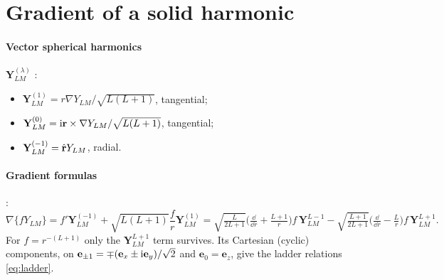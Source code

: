 \section{Gradient of a solid harmonic}
\paragraph{Vector spherical harmonics} $\mathbf Y^{(\lambda)}_{LM}$ \citep[\S7.3, eq.~25--27]{Varshalovich1988}:
\begin{itemize}
  \item $\mathbf Y^{(1)}_{LM}=r\nabla Y_{LM}/\sqrt{L(L+1)}$, tangential;
  \item $\mathbf Y^{(0)}_{LM}=\mathrm{i}\mathbf r\times\nabla Y_{LM}/\sqrt{L(L+1)}$, tangential;
  \item $\mathbf Y^{(-1)}_{LM}=\hat{\mathbf r}Y_{LM}$, radial.
\end{itemize}

\paragraph{Gradient formulas} \citep[eq.~7.3(51)]{Varshalovich1988}:
\[
  \nabla\{fY_{LM}\}=f'\mathbf Y^{(-1)}_{LM}+\sqrt{L(L+1)}\frac fr\mathbf Y^{(1)}_{LM}
  =\sqrt{\tfrac{L}{2L+1}}\Big(\tfrac{\dd}{\dd r}+\tfrac{L+1}{r}\Big)f\,\mathbf Y^{L-1}_{LM}-\sqrt{\tfrac{L+1}{2L+1}}\Big(\tfrac{\dd}{\dd r}-\tfrac{L}{r}\Big)f\,\mathbf Y^{L+1}_{LM}.
\]
For $f=r^{-(L+1)}$ only the $\mathbf Y^{L+1}_{LM}$ term survives. Its Cartesian (cyclic) components, on $\mathbf e_{\pm1}=\mp(\mathbf e_x\pm\mathrm{i}\mathbf e_y)/\sqrt2$ and $\mathbf e_0=\mathbf e_z$, give the ladder relations \eqref{eq:ladder}.
